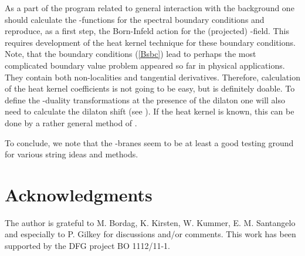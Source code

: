 \documentclass[a4paper,12pt,twoside]{article}
\begin{document}
As a part of the program related to general interaction with
the background one should calculate the \myHighlight{$\beta$}\coordHE{}-functions
for the spectral boundary conditions and reproduce, as a first
step, the Born-Infeld action for the (projected) \coordHE{}-field.
This requires development of the heat kernel technique
for these boundary conditions. Note, that the boundary
conditions (\ref{Bsbc}) lead to perhaps the most  complicated
boundary value problem appeared so far in physical applications.
They contain both non-localities and tangential derivatives.
Therefore, calculation of the heat kernel coefficients is not
going to be easy, but is definitely doable. To define the
\coordHE{}-duality transformations at the presence of the dilaton
one will also need to calculate the dilaton shift (see
\cite{Schwarz:1993te}). If the heat kernel is known, this can be
done by a rather general method of \cite{Vassilevich:2001kt}.

To conclude, we note  that the \coordHE{}-branes seem to be at least
a good testing ground for various string ideas and 
methods.

\section*{Acknowledgments}
The author is grateful to M. Bordag, K. Kirsten,
W. Kummer, E. M. Santangelo and especially to P. Gilkey for 
discussions and/or comments. This work has been supported
by the DFG project BO 1112/11-1.
\end{document}
